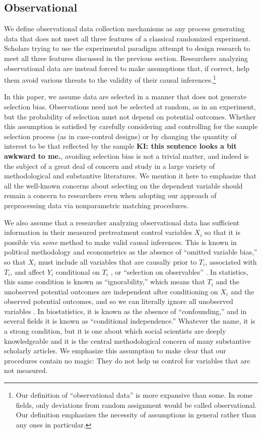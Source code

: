 \documentclass[11pt,titlepage]{article}
\begin{document}
\subsection{Observational}

We define observational data collection mechanisms as any process
generating data that does not meet all three features of a classical
randomized experiment.  Scholars trying to use the experimental
paradigm attempt to design research to meet all three features
discussed in the previous section.  Researchers analyzing
observational data are instead forced to make assumptions that, if
correct, help them avoid various threats to the validity of their
causal inferences.\footnote{Our definition of ``observational data''
  is more expansive than some.  In some fields, only deviations from
  random assignment would be called observational.  Our definition
  emphasizes the necessity of assumptions in general rather than any
  ones in particular.}

In this paper, we assume data are selected in a manner that does not
generate selection bias.  Observations need not be selected at random,
as in an experiment, but the probability of selection must not depend
on potential outcomes.  Whether this assumption is satisfied by
carefully considering and controlling for the sample selection process
(as in case-control designs) or by changing the quantity of interest
to be that reflected by the sample {\bf KI: this sentence looks a bit
  awkward to me.}, avoiding selection bias is not a trivial matter,
and indeed is the subject of a great deal of concern and study in a
large variety of methodological and substantive literatures.  We
mention it here to emphasize that all the well-known concerns about
selecting on the dependent variable should remain a concern to
researchers even when adopting our approach of preprocessing data via
nonparametric matching procedures.

We also assume that a researcher analyzing observational data has
sufficient information in their measured pretreatment control
variables $X_i$ so that it is possible via \emph{some} method to make
valid causal inferences.  This is known in political methodology and
econometrics as the absence of ``omitted variable bias,'' so that
$X_i$ must include all variables that are causally prior to $T_i$,
associated with $T_i$, and affect $Y_i$ conditional on $T_i$
\citep{Goldberger91,KinKeoVer94}, or ``selection on observables''
\citep{HecRob85}.  In statistics, this same condition is known as
``ignorability,'' which means that $T_i$ and the unobserved potential
outcomes are independent after conditioning on $X_i$ and the observed
potential outcomes, and so we can literally ignore all unobserved
variables \citep{Rubin78}.  In biostatistics, it is known as the
absence of ``confounding,'' and in several fields it is known as
``conditional independence.''  Whatever the name, it is a strong
condition, but it is one about which social scientists are deeply
knowledgeable and it is the central methodological concern of many
substantive scholarly articles.  We emphasize this assumption to make
clear that our procedures contain no magic: They do not help us
control for variables that are not measured.
\end{document}
